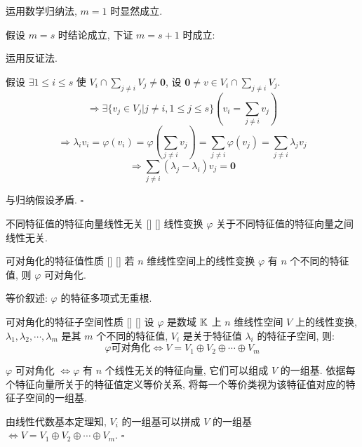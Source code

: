 \documentclass[UTF8]{ctexart}
\DeclareMathOperator{\0}{\mathbf{0}}
\DeclareMathOperator{\<}{\langle}
\renewcommand{\>}{\rangle}
\begin{document}
		\begin{prf} 

			运用数学归纳法,  \(m=1\) 时显然成立. 

			假设 \(m=s\) 时结论成立, 下证 \(m=s+1\) 时成立: 

			运用反证法. 
			
			假设 \(\exists 1\leq i\leq s\) 使 \(V_i\cap\sum\limits_{j\neq i}V_j\neq\mathbf{0}\), 设 \(\mathbf{0}\neq v\in V_i\cap\sum\limits_{j\neq i}V_j\). 
			\[\Longrightarrow\exists\{v_j\in V_j|j\neq i,1\leq j\leq s\}\left(v_i=\sum_{j\neq i}v_j\right)\]
			\[\Longrightarrow\lambda_i v_i=\varphi(v_i)=\varphi\left(\sum_{j\neq i}v_j\right)=\sum_{j\neq i}\varphi(v_j)=\sum_{j\neq i}\lambda_j v_j\]
			\[\Longrightarrow\sum_{j\neq i}(\lambda_j-\lambda_i)v_j=\mathbf{0}\]

			与归纳假设矛盾.  \(\square\) 
            \end{prf}

		\begin{ppt}
			[]
			{不同特征值的特征向量线性无关}
			[]
			[]
			线性变换 \(\varphi\) 关于不同特征值的特征向量之间线性无关. 
		\end{ppt}
		
		\begin{ppt}
			[]
			{可对角化的特征值性质}
			[]
			[]
			若 \(n\) 维线性空间上的线性变换 \(\varphi\) 有 \(n\) 个不同的特征值, 则 \(\varphi\) 可对角化. 

			等价叙述:  \(\varphi\) 的特征多项式无重根. 
		\end{ppt}
		
		\begin{ppt}
			[]
			{可对角化的特征子空间性质}
			[]
			[]
			设 \(\varphi\) 是数域 \(\operatorname{\mathbb{K}}\) 上 \(n\) 维线性空间 \(V\) 上的线性变换,  \(\lambda_1,\lambda_2,\cdots,\lambda_m\) 是其 \(m\) 个不同的特征值,  \(V_i\) 是关于特征值 \(\lambda_i\) 的特征子空间, 则: 
			\[\varphi\text{可对角化}\iff V=V_1\oplus V_2\oplus\cdots\oplus V_m\]
		\end{ppt}

		\begin{prf}
			 \(\varphi\) 可对角化 \(\iff\varphi\) 有 \(n\) 个线性无关的特征向量, 它们可以组成 \(V\) 的一组基. 依据每个特征向量所关于的特征值定义等价关系, 将每一个等价类视为该特征值对应的特征子空间的一组基. 
			
			由线性代数基本定理知,  \(V_i\) 的一组基可以拼成 \(V\) 的一组基 \(\iff V=V_1\oplus V_2\oplus\cdots\oplus V_m\).  \(\square\) 

		\end{prf} 
			
\end{document}
